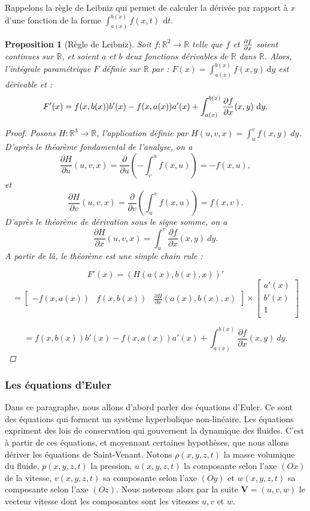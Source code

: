 \documentclass[
11pt, %
francais, %
singlespacing, %
headsepline, %
]{MastersDoctoralThesis} %
\newtheorem{prop}{Proposition}
\theoremstyle{definition}
\begin{document}
Rappelons la règle de Leibniz qui permet de calculer la dérivée par rapport à $x$ d'une fonction de la forme $\int_{a(x)}^{b(x)} f(x,t)\,~\mathrm dt$.

\begin{prop}[Règle de Leibniz]
Soit $f : \mathbb{R}^{2} \rightarrow\mathbb{R}$ telle que $f$ et ${\partial f\over\partial x}$ soient continues sur $\mathbb{R}$, et soient $a$ et $b$ deux fonctions dérivables de $\mathbb{R}$ dans $\mathbb{R}$. Alors, l'intégrale paramétrique $F$ définie sur $\mathbb{R}$ par : $F(x)=\int_{a(x)}^{b(x)}f(x,y)~\mathrm dy$ est dérivable et :
\begin{equation}
F'(x)=f(x, b(x))b'(x)-f(x,a(x))a'(x)+\int_{a(x)}^{b(x)}{\partial f\over \partial x}(x,y)~\mathrm dy.
\end{equation}
\begin{proof}
Posons $H: \mathbb{R}^{3}\rightarrow\mathbb{R}$, l'application définie par $H(u,v,x)=\int_{u}^{v}f(x,y)~dy$. D'après le théorème fondamental de l'analyse, on a $$\frac{\partial H}{\partial u}(u,v,x)=\frac{\partial}{\partial u}(-\int_{v}^{u}f(x,u))=-f(x,u),$$ et $$\frac{\partial H}{\partial v}(u,v,x)=\frac{\partial}{\partial v}(\int_{u}^{v}f(x,u))=f(x,v).$$ D'après le théorème de dérivation sous le signe somme, on a $$ \frac{\partial H}{\partial x}(u,v,x)=\int_{u}^{v} \frac{\partial f}{\partial x}(x,y)~dy. $$ A partir de là, le théorème est une simple chain rule :

$$F'(x)=(H(a(x), b(x),x))'$$
$$=\begin{bmatrix} -f(x,a(x))&f(x,b(x))&\frac{\partial H}{\partial x}(a(x),b(x),x) \end{bmatrix} \times \begin{bmatrix}
a'(x)\\
b'(x)\\
1\\
\end{bmatrix}$$ 

$$= f(x,b(x))b'(x)-f(x,a(x))a'(x)+\int_{a(x)}^{b(x)} \frac{\partial f}{\partial x}(x,y)~dy.$$
\end{proof}
\end{prop}

\subsubsection{Les équations d'Euler}

Dans ce paragraphe, nous allons d'abord parler des équations d'Euler. Ce sont des équations qui forment un système hyperbolique non-linéaire. Les équations expriment des lois de conservation qui gouvernent la dynamique des fluides. C'est à partir de ces équations, et moyennant certaines hypothèses, que nous allons dériver les équations de Saint-Venant. Notons $\rho(x,y,z,t)$ la masse volumique du fluide, $p(x,y,z,t)$ la pression, $u(x,y,z,t)$ la composante selon l'axe $(Ox)$ de la vitesse, $v(x,y,z,t)$ sa composante selon l'axe $(Oy)$ et $w(x,y,z,t)$ sa composante selon l'axe $(Oz)$. Nous noterons alors par la suite $\textbf{V}=(u,v,w )$ le vecteur vitesse dont les composantes sont les vitesses $u, v$ et $w$. 
\end{document}
